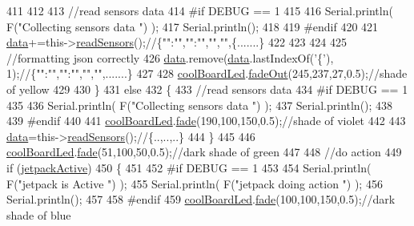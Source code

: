 \begin{DoxyCode}
411         
412                 
413         \textcolor{comment}{//read sensors data}
414 \textcolor{preprocessor}{    #if DEBUG == 1}
415 
416         Serial.println( F(\textcolor{stringliteral}{"Collecting sensors data "}) );
417         Serial.println();
418 
419 \textcolor{preprocessor}{    #endif}
420 
421         \hyperlink{classCoolBoard_a427fb753dd8575bdf821c70a5c63d695}{data}+=this->\hyperlink{classCoolBoard_ad03abdce2e65f520bbf2cff0f2d083cf}{readSensors}();\textcolor{comment}{//\{"":"","":"","","",\{.......\}}
422 
423         
424 
425         \textcolor{comment}{//formatting json correctly}
426         \hyperlink{classCoolBoard_a427fb753dd8575bdf821c70a5c63d695}{data}.remove(\hyperlink{classCoolBoard_a427fb753dd8575bdf821c70a5c63d695}{data}.lastIndexOf(\textcolor{charliteral}{'\{'}), 1);\textcolor{comment}{//\{"":"","":"","","",.......\}}
427 
428         \hyperlink{classCoolBoard_a1b1d3c684a5baa56b08486e192fd8e97}{coolBoardLed}.\hyperlink{classCoolBoardLed_a93d545679237e8cc858324367149775c}{fadeOut}(245,237,27,0.5);\textcolor{comment}{//shade of yellow}
429                 
430     \}   
431     \textcolor{keywordflow}{else}
432     \{
433         \textcolor{comment}{//read sensors data}
434 \textcolor{preprocessor}{    #if DEBUG == 1}
435 
436         Serial.println( F(\textcolor{stringliteral}{"Collecting sensors data "}) );
437         Serial.println();
438 
439 \textcolor{preprocessor}{    #endif}
440 
441         \hyperlink{classCoolBoard_a1b1d3c684a5baa56b08486e192fd8e97}{coolBoardLed}.\hyperlink{classCoolBoardLed_af1cacbaa88db8bcf6042c1083ba41155}{fade}(190,100,150,0.5);\textcolor{comment}{//shade of violet        }
442 
443         \hyperlink{classCoolBoard_a427fb753dd8575bdf821c70a5c63d695}{data}=this->\hyperlink{classCoolBoard_ad03abdce2e65f520bbf2cff0f2d083cf}{readSensors}();\textcolor{comment}{//\{..,..,..\}}
444     \}
445 
446     \hyperlink{classCoolBoard_a1b1d3c684a5baa56b08486e192fd8e97}{coolBoardLed}.\hyperlink{classCoolBoardLed_af1cacbaa88db8bcf6042c1083ba41155}{fade}(51,100,50,0.5);\textcolor{comment}{//dark shade of green  }
447 
448     \textcolor{comment}{//do action}
449     \textcolor{keywordflow}{if} (\hyperlink{classCoolBoard_a9be03a913d26e558328935ca3b59a75e}{jetpackActive})
450     \{
451 
452 \textcolor{preprocessor}{    #if DEBUG == 1}
453 
454         Serial.println( F(\textcolor{stringliteral}{"jetpack is Active "}) );
455         Serial.println( F(\textcolor{stringliteral}{"jetpack doing action "}) );
456         Serial.println();
457     
458 \textcolor{preprocessor}{    #endif}
459         \hyperlink{classCoolBoard_a1b1d3c684a5baa56b08486e192fd8e97}{coolBoardLed}.\hyperlink{classCoolBoardLed_af1cacbaa88db8bcf6042c1083ba41155}{fade}(100,100,150,0.5);\textcolor{comment}{//dark shade of blue }

\end{DoxyCode}
